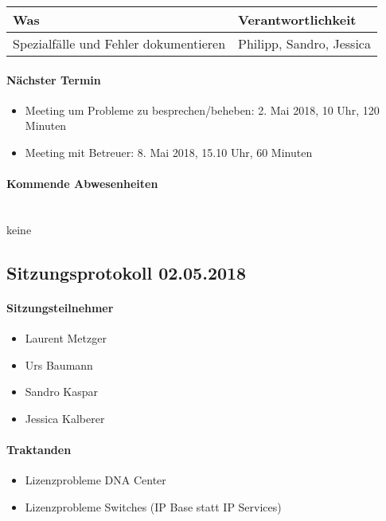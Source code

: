 \begin{table}[H]
	\centering
	\begin{tabularx}{\textwidth}{X | p{4.5cm}}
		\rowcolor{gray!50}
		\textbf{Was} & \textbf{Verantwortlichkeit} \\
		\hline
		Spezialfälle und Fehler dokumentieren & Philipp, Sandro, Jessica \\	
	\end{tabularx}
	\label{tab:my-label}
\end{table}

\paragraph{Nächster Termin}
\begin{itemize}	
	\item Meeting um Probleme zu besprechen/beheben: 2. Mai 2018, 10 Uhr, 120 Minuten
	\item Meeting mit Betreuer: 8. Mai 2018, 15.10 Uhr, 60 Minuten
\end{itemize}

\paragraph{Kommende Abwesenheiten} \mbox{}\\
keine

\newpage



\subsection{Sitzungsprotokoll 02.05.2018}

\paragraph{Sitzungsteilnehmer}
\begin{itemize}	
	\item Laurent Metzger
	\item Urs Baumann
	\item Sandro Kaspar
	\item Jessica Kalberer
\end{itemize}

\paragraph{Traktanden}
\begin{itemize}	
	\item Lizenzprobleme DNA Center
	\item Lizenzprobleme Switches (IP Base statt IP Services)
\end{itemize}

